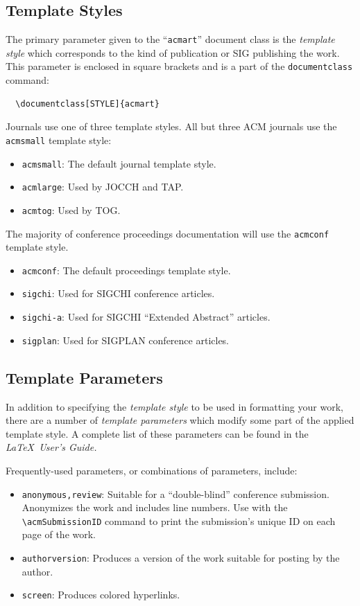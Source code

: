 \documentclass[sigconf]{acmart}
\begin{document}
\subsection{Template Styles}

The primary parameter given to the ``\verb|acmart|'' document class is
the {\itshape template style} which corresponds to the kind of publication
or SIG publishing the work. This parameter is enclosed in square
brackets and is a part of the {\verb|documentclass|} command:
\begin{verbatim}
  \documentclass[STYLE]{acmart}
\end{verbatim}

Journals use one of three template styles. All but three ACM journals
use the {\verb|acmsmall|} template style:
\begin{itemize}
\item {\verb|acmsmall|}: The default journal template style.
\item {\verb|acmlarge|}: Used by JOCCH and TAP.
\item {\verb|acmtog|}: Used by TOG.
\end{itemize}

The majority of conference proceedings documentation will use the {\verb|acmconf|} template style.
\begin{itemize}
\item {\verb|acmconf|}: The default proceedings template style.
\item{\verb|sigchi|}: Used for SIGCHI conference articles.
\item{\verb|sigchi-a|}: Used for SIGCHI ``Extended Abstract'' articles.
\item{\verb|sigplan|}: Used for SIGPLAN conference articles.
\end{itemize}

\subsection{Template Parameters}

In addition to specifying the {\itshape template style} to be used in
formatting your work, there are a number of {\itshape template parameters}
which modify some part of the applied template style. A complete list
of these parameters can be found in the {\itshape \LaTeX\ User's Guide.}

Frequently-used parameters, or combinations of parameters, include:
\begin{itemize}
\item {\verb|anonymous,review|}: Suitable for a ``double-blind''
  conference submission. Anonymizes the work and includes line
  numbers. Use with the \verb|\acmSubmissionID| command to print the
  submission's unique ID on each page of the work.
\item{\verb|authorversion|}: Produces a version of the work suitable
  for posting by the author.
\item{\verb|screen|}: Produces colored hyperlinks.
\end{itemize}
\end{document}
